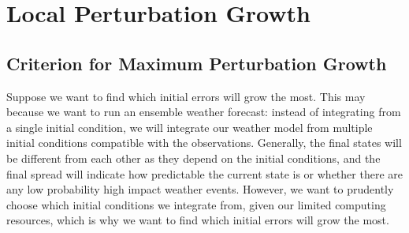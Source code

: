 \section{Local Perturbation Growth}

\subsection{Criterion for Maximum Perturbation Growth}

Suppose we want to find which initial errors will grow the most. This may because we want to run an ensemble weather forecast: instead of integrating from a single initial condition, we will integrate our weather model from multiple initial conditions compatible with the observations. Generally, the final states will be different from each other as they depend on the initial conditions, and the final spread will indicate how predictable the current state is or whether there are any low probability high impact weather events. However, we want to prudently choose which initial conditions we integrate from, given our limited computing resources, which is why we want to find which initial errors will grow the most.

